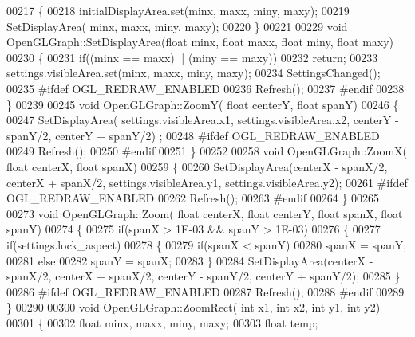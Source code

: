 \begin{DoxyCode}
{00217 \{
00218     initialDisplayArea.set(minx, maxx, miny, maxy);
00219     SetDisplayArea( minx, maxx, miny, maxy);
00220 \}
00221 
00229 \textcolor{keywordtype}{void} OpenGLGraph::SetDisplayArea(\textcolor{keywordtype}{float} minx, \textcolor{keywordtype}{float} maxx, \textcolor{keywordtype}{float} miny, \textcolor{keywordtype}{float} maxy)
00230 \{
00231   \textcolor{keywordflow}{if}((minx == maxx) || (miny == maxy))
00232     \textcolor{keywordflow}{return};
00233   settings.visibleArea.set(minx, maxx, miny, maxy);
00234   SettingsChanged();
00235 \textcolor{preprocessor}{#ifdef OGL\_REDRAW\_ENABLED}
00236   Refresh();
00237 \textcolor{preprocessor}{#endif}
00238 \}
00239 
00245 \textcolor{keywordtype}{void} OpenGLGraph::ZoomY( \textcolor{keywordtype}{float} centerY, \textcolor{keywordtype}{float} spanY)
00246 \{
00247     SetDisplayArea( settings.visibleArea.x1, settings.visibleArea.x2, centerY - spanY/2, centerY + spanY/2)
      ;
00248 \textcolor{preprocessor}{#ifdef OGL\_REDRAW\_ENABLED}
00249     Refresh();
00250 \textcolor{preprocessor}{#endif}
00251 \}
00252 
00258 \textcolor{keywordtype}{void} OpenGLGraph::ZoomX( \textcolor{keywordtype}{float} centerX, \textcolor{keywordtype}{float} spanX)
00259 \{
00260     SetDisplayArea(centerX - spanX/2, centerX + spanX/2, settings.visibleArea.y1, 
      settings.visibleArea.y2);
00261 \textcolor{preprocessor}{#ifdef OGL\_REDRAW\_ENABLED}
00262     Refresh();
00263 \textcolor{preprocessor}{#endif}
00264 \}
00265 
00273 \textcolor{keywordtype}{void} OpenGLGraph::Zoom( \textcolor{keywordtype}{float} centerX, \textcolor{keywordtype}{float} centerY, \textcolor{keywordtype}{float} spanX, \textcolor{keywordtype}{float} spanY)
00274 \{
00275     \textcolor{keywordflow}{if}(spanX > 1E-03 && spanY > 1E-03)
00276     \{
00277         \textcolor{keywordflow}{if}(settings.lock_aspect)
00278         \{
00279             \textcolor{keywordflow}{if}(spanX < spanY)
00280                 spanX = spanY;
00281             \textcolor{keywordflow}{else}
00282                 spanY = spanX;
00283         \}
00284         SetDisplayArea(centerX - spanX/2, centerX + spanX/2, centerY - spanY/2, centerY + spanY/2);
00285     \}
00286 \textcolor{preprocessor}{#ifdef OGL\_REDRAW\_ENABLED}
00287     Refresh();
00288 \textcolor{preprocessor}{#endif}
00289 \}
00290 
00300 \textcolor{keywordtype}{void} OpenGLGraph::ZoomRect( \textcolor{keywordtype}{int} x1, \textcolor{keywordtype}{int} x2, \textcolor{keywordtype}{int} y1, \textcolor{keywordtype}{int} y2)
00301 \{
00302     \textcolor{keywordtype}{float} minx, maxx, miny, maxy;
00303     \textcolor{keywordtype}{float} temp;
}
\end{DoxyCode}
